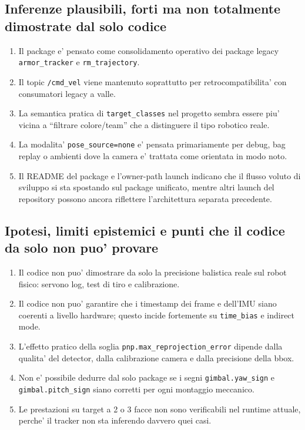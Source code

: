 \documentclass[11pt,a4paper]{article}
\newcommand{\code}[1]{\texttt{#1}}
\newcommand{\topic}[1]{\texttt{#1}}
\begin{document}
\subsection{Inferenze plausibili, forti ma non totalmente dimostrate dal solo codice}

\begin{enumerate}[leftmargin=1.4em]
  \item Il package e' pensato come consolidamento operativo dei package legacy \code{armor\_tracker} e \code{rm\_trajectory}.
  \item Il topic \topic{/cmd_vel} viene mantenuto soprattutto per retrocompatibilita' con consumatori legacy a valle.
  \item La semantica pratica di \code{target\_classes} nel progetto sembra essere piu' vicina a ``filtrare colore/team'' che a distinguere il tipo robotico reale.
  \item La modalita' \code{pose\_source=none} e' pensata primariamente per debug, bag replay o ambienti dove la camera e' trattata come orientata in modo noto.
  \item Il README del package e l'owner-path launch indicano che il flusso voluto di sviluppo si sta spostando sul package unificato, mentre altri launch del repository possono ancora riflettere l'architettura separata precedente.
\end{enumerate}

\subsection{Ipotesi, limiti epistemici e punti che il codice da solo non puo' provare}

\begin{enumerate}[leftmargin=1.4em]
  \item Il codice non puo' dimostrare da solo la precisione balistica reale sul robot fisico: servono log, test di tiro e calibrazione.
  \item Il codice non puo' garantire che i timestamp dei frame e dell'IMU siano coerenti a livello hardware; questo incide fortemente su \code{time\_bias} e indirect mode.
  \item L'effetto pratico della soglia \code{pnp.max\_reprojection\_error} dipende dalla qualita' del detector, dalla calibrazione camera e dalla precisione della bbox.
  \item Non e' possibile dedurre dal solo package se i segni \code{gimbal.yaw\_sign} e \code{gimbal.pitch\_sign} siano corretti per ogni montaggio meccanico.
  \item Le prestazioni su target a 2 o 3 facce non sono verificabili nel runtime attuale, perche' il tracker non sta inferendo davvero quei casi.
\end{enumerate}
\end{document}
